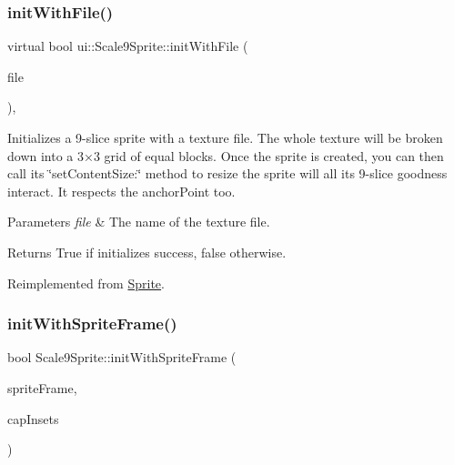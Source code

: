 \subsubsection{\texorpdfstring{init\+With\+File()}{initWithFile()}\hspace{0.1cm}{\footnotesize\ttfamily [8/8]}}
{\footnotesize\ttfamily virtual bool ui\+::\+Scale9\+Sprite\+::init\+With\+File (\begin{DoxyParamCaption}\item[{const std\+::string \&}]{file }\end{DoxyParamCaption})\hspace{0.3cm}{\ttfamily [override]}, {\ttfamily [virtual]}}

Initializes a 9-\/slice sprite with a texture file. The whole texture will be broken down into a 3×3 grid of equal blocks. Once the sprite is created, you can then call its \char`\"{}set\+Content\+Size\+:\char`\"{} method to resize the sprite will all it\textquotesingle{}s 9-\/slice goodness interact. It respects the anchor\+Point too.


\begin{DoxyParams}{Parameters}
{\em file} & The name of the texture file. \\
\hline
\end{DoxyParams}
\begin{DoxyReturn}{Returns}
True if initializes success, false otherwise. 
\end{DoxyReturn}


Reimplemented from \hyperlink{classSprite_aaf44b73e6e009525f1cd222985a5ed4f}{Sprite}.

\mbox{\label{classui_1_1Scale9Sprite_a91d24fd8e04f2db89c58c3e1e6c17e14}} 
\subsubsection{\texorpdfstring{init\+With\+Sprite\+Frame()}{initWithSpriteFrame()}\hspace{0.1cm}{\footnotesize\ttfamily [1/3]}}
{\footnotesize\ttfamily bool Scale9\+Sprite\+::init\+With\+Sprite\+Frame (\begin{DoxyParamCaption}\item[{\hyperlink{classSpriteFrame}{Sprite\+Frame} $\ast$}]{sprite\+Frame,  }\item[{const \hyperlink{classRect}{Rect} \&}]{cap\+Insets }\end{DoxyParamCaption})\hspace{0.3cm}{\ttfamily [virtual]}}

